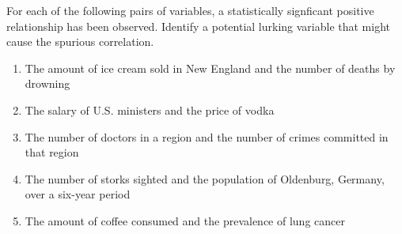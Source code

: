 \documentclass[10pt]{article}\usepackage[]{graphicx}\usepackage[]{color}
\begin{document}
For each of the following pairs of variables, a statistically signficant positive relationship has been observed. Identify a potential lurking variable that might cause the spurious correlation.
\begin{enumerate}
  \itemsep0.5in
  \item The amount of ice cream sold in New England and the number of deaths by drowning
  \item The salary of U.S. ministers and the price of vodka
  \item The number of doctors in a region and the number of crimes committed in that region
  \item The number of storks sighted and the population of Oldenburg, Germany, over a six-year period
  \item The amount of coffee consumed and the prevalence of lung cancer
\end{enumerate}
\end{document}
